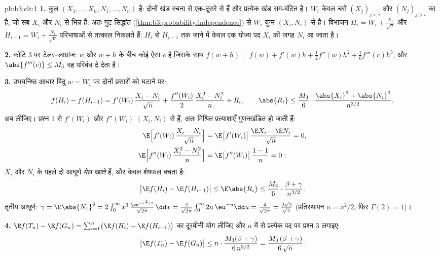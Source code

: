 \begin{solution}{pb:b3:clt:1}
\textbf{1.} कुल $(X_1, \dots, X_n, N_1, \dots, N_n)$
 है: दोनों खंड रचना से एक-दूसरे से  हैं और
प्रत्येक खंड  सम-बंटित है। $W_i$ केवल चरों
$(X_j)_{j<i}$ और $(N_j)_{j>i}$ का  है, जो सब $X_i$
और $N_i$ से भिन्न हैं: अतः गुट सिद्धांत
(\cref{thm:b3:probability:independence}) से $W_i$ युग्म
$(X_i, N_i)$ से  है। विभाजन
$H_i = W_i + \frac{X_i}{\sqrt n}$ और $H_{i-1} = W_i +
\frac{N_i}{\sqrt n}$ परिभाषाओं से तत्काल निकलते हैं: $H_i$
से $H_{i-1}$ तक जाने में केवल एक योज्य पद $X_i$ की जगह $N_i$
आ जाता है।

\textbf{2.} कोटि $3$ पर टेलर--लाग्रांज: $w$ और $w + h$ के
बीच कोई ऐसा $c$ है जिसके साथ $f(w + h) = f(w) + f'(w)h +
\frac12f''(w)h^2 + \frac16f'''(c)h^3$, और $\abs{f'''(c)}
\leq M_3$ वह परिबंध दे देता है।

\textbf{3.} उभयनिष्ठ आधार बिंदु $w = W_i$ पर दोनों प्रसारों
को घटाने पर:
\[
f(H_i) - f(H_{i-1}) = f'(W_i)\,\frac{X_i - N_i}{\sqrt n} +
\frac{f''(W_i)}{2}\,\frac{X_i^2 - N_i^2}{n} + R_i,
\qquad
\abs{R_i} \leq \frac{M_3}{6}\cdot
\frac{\abs{X_i}^3 + \abs{N_i}^3}{n^{3/2}} .
\]
अब  लीजिए। प्रश्न 1 से $f'(W_i)$ और $f''(W_i)$
$(X_i, N_i)$ से  हैं, अतः मिश्रित प्रत्याशाएँ
गुणनखंडित हो जाती हैं:
\begin{align*}
\E\Bigl[f'(W_i)\,\frac{X_i - N_i}{\sqrt n}\Bigr] &=
\E\bigl[f'(W_i)\bigr]\,\frac{\E X_i - \E N_i}{\sqrt n} = 0,
\\
\E\Bigl[f''(W_i)\,\frac{X_i^2 - N_i^2}{n}\Bigr] &=
\E\bigl[f''(W_i)\bigr]\,\frac{1 - 1}{n} = 0 :
\end{align*}
$X_i$ और $N_i$ के पहले दो आघूर्ण \emph{मेल खाते} हैं, और
केवल शेषफल बचता है:
\[
\bigl|\E f(H_i) - \E f(H_{i-1})\bigr| \leq \E\abs{R_i} \leq
\frac{M_3}{6}\cdot\frac{\beta + \gamma}{n^{3/2}} .
\]
 तृतीय आघूर्ण: $\gamma = \E\abs{N_1}^3 =
2\int_0^\infty x^3\,\frac{\eu^{-x^2/2}}{\sqrt{2\pi}}\,\dd x
= \frac{2}{\sqrt{2\pi}}\int_0^\infty 2u\,\eu^{-u}\dd u =
\frac{4}{\sqrt{2\pi}} = \frac{2\sqrt2}{\sqrt\pi}$
(प्रतिस्थापन $u = x^2/2$, फिर $\Gamma(2) = 1$)।

\textbf{4.} $\E f(T_n) - \E f(G_n) =
\sum_{i=1}^n\bigl(\E f(H_i) - \E f(H_{i-1})\bigr)$ का
दूरबीनी योग लीजिए और $n$ में से प्रत्येक पद पर प्रश्न 3
लगाइए:
\[
\bigl|\E f(T_n) - \E f(G_n)\bigr| \leq
n \cdot \frac{M_3(\beta + \gamma)}{6\,n^{3/2}} =
\frac{M_3\,(\beta + \gamma)}{6\,\sqrt n} .
\]


\end{solution}
